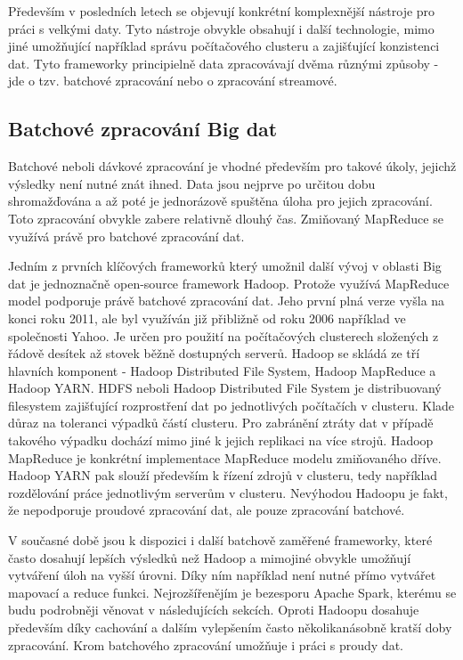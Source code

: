 \documentclass[thesis=B,czech]{FITthesis}[2012/06/26]
\begin{document}
	Především v posledních letech se objevují konkrétní komplexnější nástroje pro práci s velkými daty. Tyto nástroje obvykle obsahují i další technologie, mimo jiné umožňující například správu počítačového clusteru a zajišťující konzistenci dat. Tyto frameworky principielně data zpracovávají dvěma různými způsoby - jde o tzv. batchové zpracování nebo o zpracování streamové. 
	
\subsection{Batchové zpracování Big dat}
	Batchové neboli dávkové zpracování je vhodné především pro takové úkoly, jejichž výsledky není nutné znát ihned. Data jsou nejprve po určitou dobu shromažďována a až poté je jednorázově spuštěna úloha pro jejich zpracování. Toto zpracování obvykle zabere relativně dlouhý čas. Zmiňovaný MapReduce se využívá právě pro batchové zpracování dat. 

	Jedním z prvních klíčových frameworků který umožnil další vývoj v oblasti Big dat je jednoznačně open-source framework Hadoop\cite{hadoop-home}. Protože využívá MapReduce model podporuje právě batchové zpracování dat. Jeho první plná verze vyšla na konci roku 2011, ale byl využíván již přibližně od roku 2006 například ve společnosti Yahoo\cite{hadoop-history}. Je určen pro použití na počítačových clusterech složených z řádově desítek až stovek běžně dostupných serverů. Hadoop se skládá ze tří hlavních komponent - Hadoop Distributed File System, Hadoop MapReduce a Hadoop YARN. HDFS neboli Hadoop Distributed File System je distribuovaný filesystem zajišťující rozprostření dat po jednotlivých počítačích v clusteru. Klade důraz na toleranci výpadků částí clusteru. Pro zabránění ztráty dat v případě takového výpadku dochází mimo jiné k jejich replikaci na více strojů. Hadoop MapReduce je konkrétní implementace MapReduce modelu zmiňovaného dříve. Hadoop YARN pak slouží především k řízení zdrojů v clusteru, tedy například rozdělování práce jednotlivým serverům v clusteru. Nevýhodou Hadoopu je fakt, že nepodporuje proudové zpracování dat, ale pouze zpracování batchové. 
	
	V současné době jsou k dispozici i další batchově zaměřené frameworky, které často dosahují lepších výsledků než Hadoop a mimojiné obvykle umožňují vytváření úloh na vyšší úrovni. Díky ním například není nutné přímo vytvářet mapovací a reduce funkci. Nejrozšířenějím je bezesporu Apache Spark\cite{spark-home}, kterému se budu podrobněji věnovat v následujících sekcích. Oproti Hadoopu dosahuje především díky cachování a dalším vylepšením často několikanásobně kratší doby zpracování. Krom batchového zpracování umožňuje i práci s proudy dat. 
\end{document}
